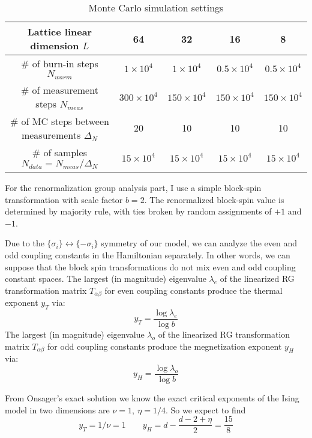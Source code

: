 \documentclass{article}
\begin{document}
\begin{table}[H]
\centering
\begin{tabular}{|c|c|c|c|c|} 
 \hline
 Lattice linear dimension $L$ & 64 & 32 & 16 & 8 \\ 
 \hline
 \# of burn-in steps $N_{warm}$ & $1\times 10^4$& $1\times 10^4$& $0.5\times 10^4$& $0.5\times 10^4$ \\ 
 \hline
 \# of measurement steps $N_{meas}$& $300\times 10^4$& $150\times 10^4$& $150\times 10^4$& $150\times 10^4$\\
 \hline
 \# of MC steps between measurements $\Delta_N$ & 20 & 10 & 10 & 10 \\
 \hline
 \# of samples $N_{data} = N_{meas}/\Delta_{N}$ & $15\times 10^4$& $15 \times 10^4$& $15\times 10^4$& $15\times 10^4$ \\
 \hline
 \end{tabular}
 \caption{\label{MCSettings}Monte Carlo simulation settings}
\end{table}

For the renormalization group analysis part, I use a simple block-spin transformation with scale factor $b = 2$. The renormalized block-spin value is determined by majority rule, with ties broken by random assignments of $+1$ and $-1$.  


Due to the $\{\sigma_i\} \leftrightarrow \{-\sigma_i\}$ symmetry of our model, we can analyze the even and odd coupling constants in the Hamiltonian separately. In other words, we can suppose that the block spin transformations do not mix even and odd coupling constant spaces. The largest (in magnitude) eigenvalue $\lambda_e$ of the linearized RG transformation matrix $T_{\alpha\beta}$ for even coupling constants produce the thermal exponent $y_T$ via:
\begin{equation}
y_T = \frac{\log \lambda_e}{\log b}
\end{equation}
The largest (in magnitude) eigenvalue $\lambda_o$ of the linearized RG transformation matrix $T_{\alpha\beta}$ for odd coupling constants  produce the megnetization exponent $y_H$ via:
\begin{equation}
y_H = \frac{\log \lambda_o}{\log b}
\end{equation}

From Onsager's exact solution \cite{Onsager1944} we know the exact critical exponents of the Ising model in two dimensions are $\nu = 1 ,\  \eta = 1/4$. So we expect to find
\begin{equation*}
y_T = 1/\nu = 1 \qquad y_H = d-\frac{d-2+\eta}{2}= \frac{15}{8}
\end{equation*}
\end{document}
